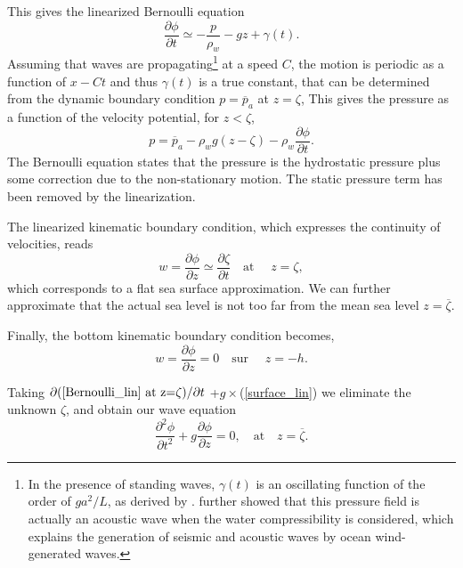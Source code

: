 This gives the linearized Bernoulli equation
\begin{equation}
    \frac{\partial \phi}{\partial t} \simeq 
       -\frac{p}{\rho_w}-g z + \gamma(t).\label{Bernoulli_lin}
\end{equation}
Assuming that waves are propagating\footnote{In the presence of standing waves, $\gamma(t)$ 
is an oscillating function of the order of $g a^2/L$, as derived by \cite{Miche1944d}.  \cite{Longuet-Higgins1950} further showed that this pressure field is actually an acoustic wave when the water compressibility is considered, which explains the generation of seismic and acoustic waves by ocean wind-generated waves.} at a speed $C$, the motion is periodic as a function of $x-C t$ and thus $\gamma(t)$ is a true constant, that can be determined from the dynamic boundary condition $p=\overline{p}_a$ at $z=\zeta$,
This gives the pressure as a function of the velocity potential, for $z< \zeta$, 
\begin{equation}
    p=\overline{p}_a -{\rho_w}g(z-\zeta) 
    -\rho_w \frac{\partial \phi}{\partial t}.\label{p_all}
\end{equation}
The Bernoulli equation states that the pressure is the hydrostatic pressure plus some correction 
due to the non-stationary motion. The static pressure term has been removed by the linearization. 

The linearized kinematic boundary condition, which expresses the continuity of velocities, reads
\begin{equation}
    w = \frac{\partial \phi }{\partial z} \simeq \frac{\partial \zeta}{\partial t}
    \quad \mbox{at\ }\quad z=\zeta,  \label{surface_lin}
\end{equation} which corresponds to a flat sea surface approximation. 
We can further approximate that the actual sea level is not too far from the mean sea level $z=\overline{\zeta}$. 


Finally, the bottom kinematic boundary condition becomes, 
\begin{equation}
    w=\frac{\partial \phi }{\partial z}=0 \quad \mbox{sur\ }\quad z=-h.  \label{bottom}
\end{equation}

Taking  $\partial (\ref{Bernoulli_lin} \textrm{~at z=}\zeta)/\partial t $
+$g\times$(\ref{surface_lin}) we eliminate the unknown $\zeta$, and obtain our 
wave equation 
\begin{equation}
  \frac{\partial^2{\phi}}{\partial{t^2}}+g\frac{\partial\phi}{\partial z}=0, \quad \mbox{at}
\quad  z=\overline{\zeta}. \label{surface 1}
\end{equation}

